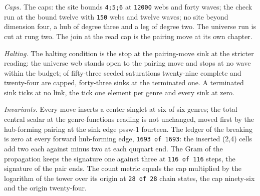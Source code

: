 \begin{chdefinition}
\textit{Caps.} The caps: the site bounds \texttt{4;5;6} at \texttt{12000} webs and forty waves; the check run at the bound twelve with \texttt{150} webs and twelve waves; no site beyond dimension four, a hub of degree three and a leg of degree two. The universe run is cut at rung two. The join at the read cap is the pairing move at its own chapter.

\textit{Halting.} The halting condition is the stop at the pairing-move sink at the stricter reading: the universe web stands open to the pairing move and stops at no wave within the budget; of fifty-three seeded saturations twenty-nine complete and twenty-four are capped, forty-three sinks at the terminated one. A terminated sink ticks at no link, the tick one element per genre and every sink at zero.

\textit{Invariants.} Every move inserts a center singlet at six of six genres; the total central scalar at the genre-functions reading is not unchanged, moved first by the hub-forming pairing at the sink edge pssw-1 fourteen. The ledger of the breaking is zero at every forward hub-forming edge, \texttt{1693 of 1693}: the inserted (2,4) cells add two each against minus two at each ququart end. The Gram of the propagation keeps the signature one against three at \texttt{116 of 116} steps, the signature of the pair ends. The count metric equals the cap multiplied by the logarithm of the tower over its origin at \texttt{28 of 28} chain states, the cap ninety-six and the origin twenty-four.

\end{chdefinition}
